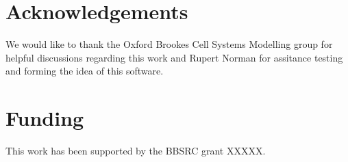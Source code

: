 \documentclass{bioinfo}
\begin{document}
\section*{Acknowledgements}
We would like to thank the Oxford Brookes Cell Systems Modelling group for helpful discussions regarding this work and Rupert Norman for assitance testing and forming the idea of this software.

\section*{Funding}
This work has been supported by the BBSRC grant XXXXX.




\end{document}
